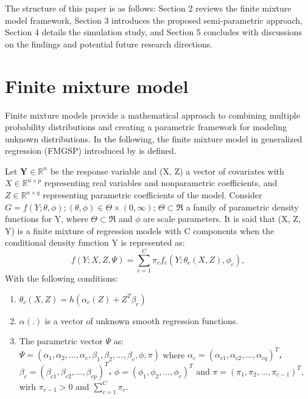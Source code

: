The structure of this paper is as follows: Section 2 reviews the finite mixture model framework, Section 3 introduces the proposed semi-parametric approach, Section 4 details the simulation study, and Section 5 concludes with discussions on the findings and potential future research directions.

%
%
\section{Finite mixture model} \label{sec2}
\qquad Finite mixture models provide a mathematical approach to combining multiple probability distributions and creating a parametric framework for modeling unknown distributions. In the following, the finite mixture model in generalized regression (FMGSP) introduced by 
\hbox{\cite{Ormoz-Eskandari2016}} 
is defined. 
\begin{Definition} \label{def1}
Let $ \mathbf{Y} \in \mathbb{R}^{n } $ be the response variable and (X, Z) a vector of covariates with $ X \in \mathbb{R}^{n \times p } $ representing real variables and nonparametric coefficients, and $ Z \in \mathbb{R}^{n \times q } $ representing parametric coefficients of the model. Consider $ G = {f(Y; \theta ,\phi); (\theta ,\phi) \in \Theta \times (0,\infty)} $; $  \Theta \subset \mathfrak{R} $ a family of parametric density functions for Y, where $  \Theta \subset \mathfrak{R} $ and $ \phi $ are scale parameters. It is said that (X, Z, Y) is a finite mixture of regression models with C components when the conditional density function Y is represented as:
\[
f(Y; X, Z, \Psi) = \sum_{c=1}^{C} \pi_{c}  f_{c}(Y; \theta_{c} (X, Z),\phi_{c}),
\]
With the following conditions:
 \begin{enumerate}
	\item  $ \theta_{c}(X, Z) = h(\alpha_{c}(Z)+ Z^{T} \beta_{c}) $
	\item  $ \alpha(.) $ is a vector of unknown smooth regression functions.
	\item The parametric vector $ \Psi $ as:\\
	$ \Psi=(\alpha_{1}, \alpha_{2}, ...,\alpha_{c},\beta_{1},\beta_{2}, ...,\beta_{c},\phi,\pi) $ where $ \alpha_{c} = (\alpha_{c1}, \alpha_{c2}, ...,\alpha_{cq})^{T} $،
	$ \beta_{c} = (\beta_{c1}, \beta_{c2}, ...,\beta_{cp})^{T} $،
	$ \phi = (\phi_{1}, \phi_{2}, ...,\phi_{c})^{T} $
	and
	$ \pi = (\pi_{1}, \pi_{2}, ...,\pi_{c-1})^{T} $,
	wirh
	$ \pi_{c-1} > 0 $
	and
	$ \sum_{c =1}^{C} \pi_{c} $.
\end{enumerate}
\end{Definition}


